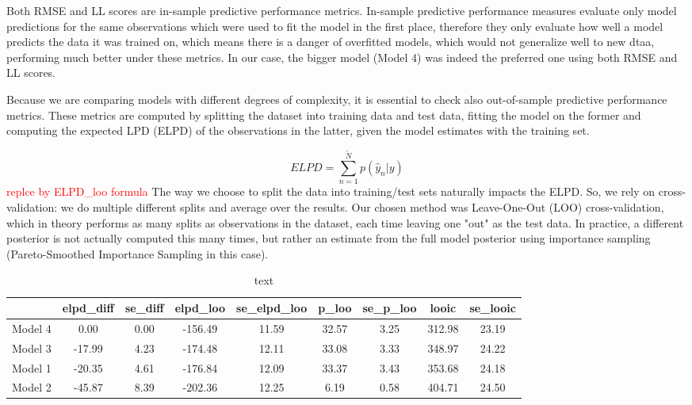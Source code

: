 \documentclass[12pt]{article}
\newcommand{\red}[1]{\textcolor{red}{#1}}
\begin{document}


Both RMSE and LL scores are in-sample predictive performance metrics. In-sample predictive performance measures evaluate only model predictions for the same observations which were used to fit the model in the first place, therefore they only evaluate how well a model predicts the data it was trained on, which means there is a danger of overfitted models, which would not generalize well to new dtaa, performing much better under these metrics.
In our case, the bigger model (Model 4) was indeed the preferred one using both RMSE and LL scores.

Because we are comparing models with different degrees of complexity, it is essential to check also out-of-sample predictive performance metrics. These metrics are computed by splitting the dataset into training data and test data, fitting the model on the former and computing the expected LPD (ELPD) of the observations in the latter, given the model estimates with the training set. 

\begin{equation}
	ELPD = \sum_{n= 1}^{\tilde{N}} p(\hat{y}_n | y)
\end{equation}
\red{replce by ELPD\_loo formula}
The way we choose to split the data into training/test sets naturally impacts the ELPD. So, we rely on cross-validation: we do multiple different splits and average over the results. Our chosen method was Leave-One-Out (LOO) cross-validation, which in theory performs as many splits as observations in the dataset, each time leaving one "out" as the test data. In practice, a different posterior is not actually computed this many times, but rather an estimate from the full model posterior using importance sampling (Pareto-Smoothed Importance Sampling in this case).

\begin{table}[ht]
	\centering
	\begin{tabular}{rcccccccc}
		\hline
		& elpd\_diff & se\_diff & elpd\_loo & se\_elpd\_loo & p\_loo & se\_p\_loo & looic & se\_looic \\ 
		\hline
		Model 4 & 0.00 & 0.00 & -156.49 & 11.59 & 32.57 & 3.25 & 312.98 & 23.19 \\ 
		Model 3 & -17.99 & 4.23 & -174.48 & 12.11 & 33.08 & 3.33 & 348.97 & 24.22 \\ 
		Model 1 & -20.35 & 4.61 & -176.84 & 12.09 & 33.37 & 3.43 & 353.68 & 24.18 \\ 
		Model 2 & -45.87 & 8.39 & -202.36 & 12.25 & 6.19 & 0.58 & 404.71 & 24.50 \\ 
		\hline
	\end{tabular}
	\caption{text}
	\label{tab:loo}
\end{table}
\end{document}
